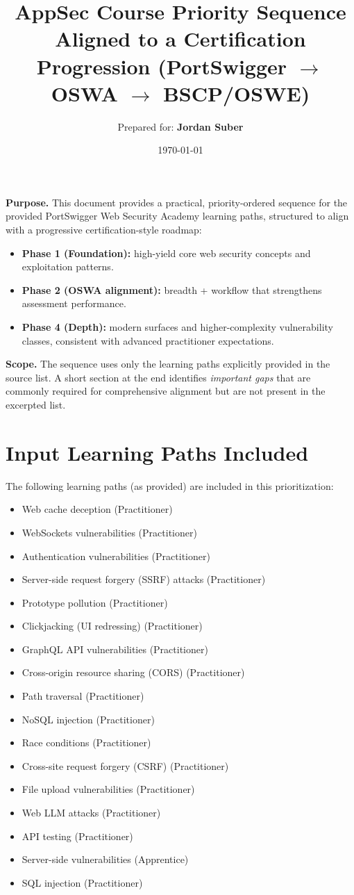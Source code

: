 \documentclass[11pt]{article}
\title{\textbf{AppSec Course Priority Sequence}\\
\large Aligned to a Certification Progression (PortSwigger $\rightarrow$ OSWA $\rightarrow$ BSCP/OSWE)}
\author{Prepared for: \textbf{Jordan Suber}}
\date{\today}
\begin{document}
\maketitle

\begin{infobox}
\textbf{Purpose.} This document provides a practical, priority-ordered sequence for the provided PortSwigger Web Security Academy learning paths, structured to align with a progressive certification-style roadmap:
\begin{itemize}
  \item \textbf{Phase 1 (Foundation):} high-yield core web security concepts and exploitation patterns.
  \item \textbf{Phase 2 (OSWA alignment):} breadth + workflow that strengthens assessment performance.
  \item \textbf{Phase 4 (Depth):} modern surfaces and higher-complexity vulnerability classes, consistent with advanced practitioner expectations.
\end{itemize}

\textbf{Scope.} The sequence uses only the learning paths explicitly provided in the source list. A short section at the end identifies \emph{important gaps} that are commonly required for comprehensive alignment but are not present in the excerpted list.
\end{infobox}

\section{Input Learning Paths Included}
The following learning paths (as provided) are included in this prioritization:
\begin{itemize}
  \item Web cache deception (Practitioner)
  \item WebSockets vulnerabilities (Practitioner)
  \item Authentication vulnerabilities (Practitioner)
  \item Server-side request forgery (SSRF) attacks (Practitioner)
  \item Prototype pollution (Practitioner)
  \item Clickjacking (UI redressing) (Practitioner)
  \item GraphQL API vulnerabilities (Practitioner)
  \item Cross-origin resource sharing (CORS) (Practitioner)
  \item Path traversal (Practitioner)
  \item NoSQL injection (Practitioner)
  \item Race conditions (Practitioner)
  \item Cross-site request forgery (CSRF) (Practitioner)
  \item File upload vulnerabilities (Practitioner)
  \item Web LLM attacks (Practitioner)
  \item API testing (Practitioner)
  \item Server-side vulnerabilities (Apprentice)
  \item SQL injection (Practitioner)
\end{itemize}
\end{document}

